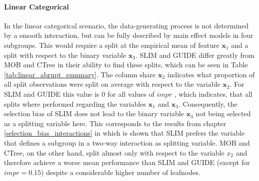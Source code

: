 \paragraph{Linear Categorical} 
In the linear categorical scenario, the data-generating process is not determined by a smooth interaction, but can be fully described by main effect models in four subgroups.
This would require a split at the empirical mean of  feature $\textbf{x}_1$ and a split with respect to the binary variable $\textbf{x}_3$. 
SLIM and GUIDE differ greatly from MOB and CTree in their ability to find these splits, which can be seen in Table \ref{tab:linear_abrupt_summary}. 
The column share $\textbf{x}_2$ indicates what proportion of all split observations were split on average with respect to the variable $\textbf{x}_2$.
For SLIM and GUIDE this value is $0$ for all values of $impr$ , which indicates, that all splits where performed regarding the variables $\textbf{x}_1$ and $\textbf{x}_3$.  Consequently, the selection bias of SLIM does not lead to the binary variable $\textbf{x}_3$ not being selected as a splitting variable here. This corresponds to the results from chapter \ref{selection_bias_interactions} in which is shown that SLIM prefers the variable that defines a subgroup in a two-way interaction as  splitting variable.
MOB and CTree, on the other hand, split almost only with respect to the variable $x_2$ and therefore achieve a worse mean performance than SLIM and GUIDE (except for $impr = 0.15$) despite a considerable higher number of leafnodes.

